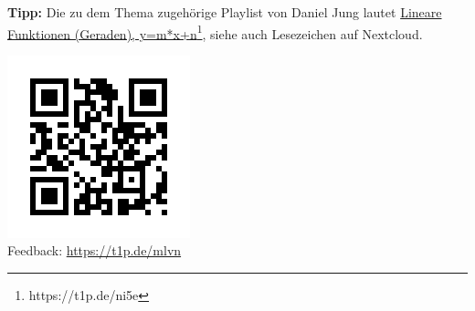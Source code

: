 \documentclass[a4paper,ngerman,12pt]{exam}
\begin{document}

\par \textbf{Tipp:} Die zu dem Thema zugehörige Playlist von Daniel Jung lautet \href{https://t1p.de/ni5e}{Lineare Funktionen (Geraden), y=m*x+n\footnote{\url{https://t1p.de/ni5e}}}, siehe auch Lesezeichen auf Nextcloud.

\includegraphics[scale=0.4]{qr-code-t1p-de-mlvn.png}\\
Feedback: \href{https://t1p.de/mlvn}{https://t1p.de/mlvn}

%
\end{document}
